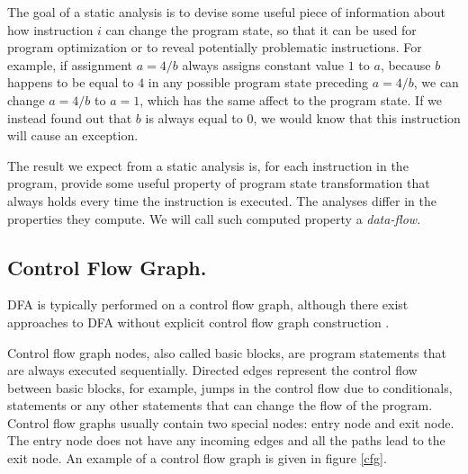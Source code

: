         The goal of a static analysis is to devise some useful piece of information 
        about how instruction $i$ can change the program state, so that it can 
        be used for program optimization or to reveal potentially problematic 
        instructions. For example, if assignment $a=4/b$ always assigns 
        constant value $1$ to $a$, because $b$ happens to be equal to $4$ 
        in any possible program state preceding $a=4/b$, we can change 
        $a=4/b$ to $a=1$, which has the same affect to the program state. 
        If we instead found out that $b$ is always equal to $0$, we would 
        know that this instruction will cause an exception.
        
        The result we expect from a static analysis is, for each instruction 
        in the program, provide some useful property of program state transformation 
        that always holds every time the instruction is executed. 
        The analyses differ in the properties they compute. 
        We will call such computed property a \emph{data-flow}.
        
        
        \subsection{Control Flow Graph.} 
        DFA is typically performed on a control flow graph, 
        although there exist approaches to DFA 
        without explicit control flow graph 
        construction \cite{mohnen2002graph}.
        
        Control flow graph nodes, also called basic blocks, 
        are program statements that are always executed sequentially. 
        Directed edges represent the control flow between basic blocks, 
        for example, jumps in the control flow due to conditionals, 
         statements or any other statements that can change 
        the flow of the program.        
        Control flow graphs usually contain two special nodes: 
        entry node and exit node. The entry node does not have any 
        incoming edges and all the paths lead to the exit node.        
        An example of a control flow graph is given in figure \ref{cfg}.
        
